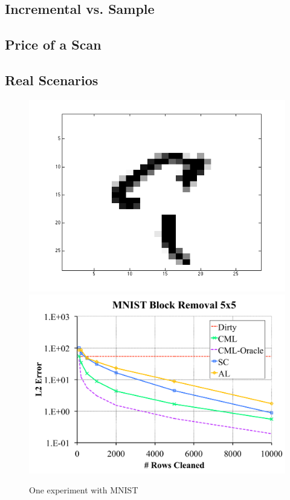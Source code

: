 \subsection{Incremental vs. Sample}

\subsection{Price of a Scan}

\subsection{Real Scenarios}

\begin{figure}[t]
\centering
 \includegraphics[scale=0.25]{exp/5x5removal.png}
 \includegraphics[scale=0.15]{exp/exp7a.pdf}
 \caption{One experiment with MNIST}
\end{figure}

